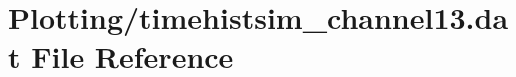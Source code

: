 \hypertarget{Plotting_2timehistsim__channel13_8dat}{}\section{Plotting/timehistsim\+\_\+channel13.dat File Reference}
\label{Plotting_2timehistsim__channel13_8dat}
